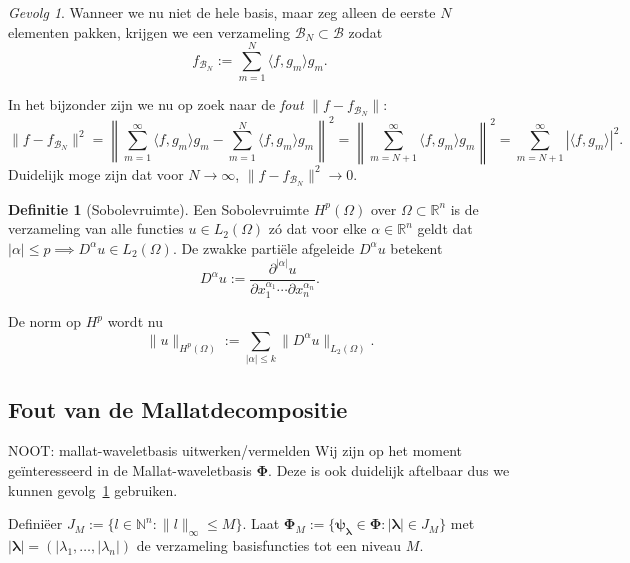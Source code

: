 \documentclass[11pt]{uvamath}
\newcommand{\R}{\mathbb{R}}
\newcommand{\N}{\mathbb{N}}
\theoremstyle{plain}
\theoremstyle{definition}
\newtheorem{definitie}[stelling]{Definitie}
\theoremstyle{remark}
\newtheorem{gevolg}{Gevolg}[stelling]
\begin{document}
\begin{gevolg}
\label{linfout}
Wanneer we nu niet de hele basis, maar zeg alleen de eerste $N$ elementen pakken, krijgen we een verzameling $\mathcal{B}_N \subset \mathcal{B}$ zodat
\[
f_{\mathcal{B}_N} := \sum_{m = 1}^N \langle f, g_m \rangle g_m.
\]

In het bijzonder zijn we nu op zoek naar de \emph{fout} $\| f - f_{\mathcal{B}_N} \|$:
\[
\| f - f_{\mathcal{B}_N} \|^2 = \left\| \sum_{m=1}^\infty\langle f, g_m \rangle g_m - \sum_{m=1}^N \langle f, g_m \rangle g_m \right\|^2 = \left\| \sum_{m=N+1}^\infty\langle f, g_m \rangle g_m \right\|^2 = \sum_{m=N+1}^\infty | \langle f, g_m \rangle |^2.
\]
Duidelijk moge zijn dat voor $N \to \infty$, $\| f - f_{\mathcal{B}_N} \|^2 \to 0$.
\end{gevolg}

\begin{definitie}[Sobolevruimte]
Een Sobolevruimte $H^p(\Omega)$ over $\Omega \subset \R^n$ is de verzameling van alle functies $u \in L_2(\Omega)$ z\'o dat voor elke $\alpha \in \R^n$ geldt dat $|\alpha| \leq p \implies D^\alpha u \in L_2(\Omega)$. De zwakke parti\"ele afgeleide $D^\alpha u$ betekent
\[
	D^\alpha u := \frac{\partial^{|\alpha|} u}{\partial x_1^{\alpha_1} \cdots \partial x_n^{\alpha_n} }.
\]

De norm op $H^p$ wordt nu
\[
	\| u \|_{H^p(\Omega)} := \sum_{|\alpha| \leq k} \| D^\alpha u \|_{L_2(\Omega)}.
\]
\end{definitie}

\subsection{Fout van de Mallatdecompositie}
NOOT: mallat-waveletbasis uitwerken/vermelden
Wij zijn op het moment ge\"interesseerd in de Mallat-waveletbasis $\boldsymbol\Phi$. Deze is ook duidelijk aftelbaar dus we kunnen gevolg~\ref{linfout} gebruiken. 

Defini\"eer $J_M := \{ l \in \N^n: \| l \|_\infty \leq M \}$. Laat $\boldsymbol\Phi_M := \{ \boldsymbol{\psi}_{\boldsymbol{\lambda}} \in \boldsymbol\Phi: |\boldsymbol\lambda| \in J_M \}$ met $|\boldsymbol\lambda| = (|\lambda_1, \ldots, |\lambda_n|)$ de verzameling basisfuncties tot een niveau $M$.
\end{document}
